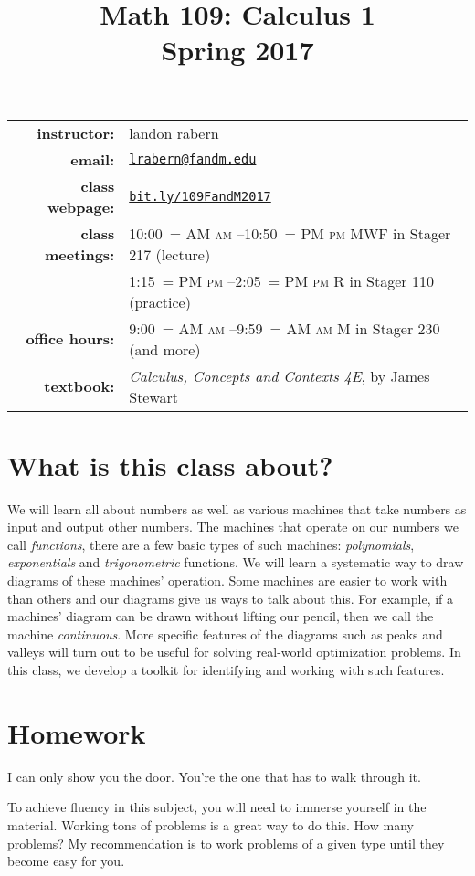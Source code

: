 \documentclass[12pt]{article}
\title{Math 109: Calculus 1\\ \bigskip\small{Spring 2017}}
\date{}
\makeatletter
\DeclareRobustCommand{\maybefakesc}[1]{%
  \ifnum\pdfstrcmp{\f@series}{\bfdefault}=\z@
    {\fontsize{\dimexpr0.8\dimexpr\f@size pt\relax}{0}\selectfont\uppercase{#1}}%
  \else
    \textsc{#1}%
  \fi
}
\newcommand\AM{\,\maybefakesc{am}\xspace}
\newcommand\PM{\,\maybefakesc{pm}\xspace}
\makeatother
\begin{document}
\maketitle

\begin{tabular}{r l}
\textbf{instructor:}& landon rabern\\
\textbf{email:}& \href{mailto:lrabern@fandm.edu}{\nolinkurl{lrabern@fandm.edu}}\\
\textbf{class webpage:}& \href{http://bit.ly/109FandM2017}{\nolinkurl{bit.ly/109FandM2017}}\\
\textbf{class meetings:}& 10:00\AM--10:50\PM MWF in Stager 217 (lecture)\\
& 1:15\PM--2:05\PM R in Stager 110 (practice)\\
\textbf{office hours:}& 9:00\AM--9:59\AM M in Stager 230 (and more)\\
\textbf{textbook:}&\textit{Calculus, Concepts and Contexts 4E}, by James Stewart\\
\end{tabular}

\bigskip

\section*{What is this class about?}
We will learn all about numbers as well as various machines that take numbers as input and output other numbers.
The machines that operate on our numbers we call \emph{functions}, there are a few basic types of such machines: \emph{polynomials}, \emph{exponentials} and \emph{trigonometric} functions.
We will learn a systematic way to draw diagrams of these machines' operation.  Some machines are easier to work with than others and our diagrams give us ways to talk about this.  For
example, if a machines' diagram can be drawn without lifting our pencil, then we call the machine \emph{continuous}.  More specific features of the diagrams such as peaks and valleys will turn out
to be useful for solving real-world optimization problems.  In this class, we develop a toolkit for identifying and working with such features.
\section*{Homework} 
\epigraph{I can only show you the door. You're the one that has to walk through it.}{}
To achieve fluency in this subject, you will need to immerse yourself in the material.  
Working tons of problems is a great way to do this.  How many problems?  
My recommendation is to work problems of a given type until they become easy for you.
\end{document}

